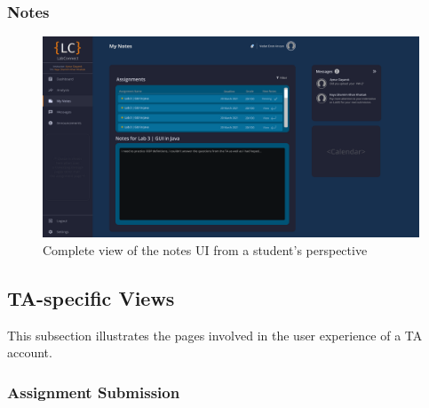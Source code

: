\documentclass[a4paper, 12pt]{article}
\begin{document}
    
    
    
    
    
    
    
    
    
    
    \pagebreak
    
    \subsubsection{Notes}
    
    \begin{figure}[H]
        \centering
        \includegraphics[width=\textwidth]{student_notes}
        \caption{Complete view of the notes UI from a student's perspective}
        \label{fig:student_notes_full}
    \end{figure}
    
    
    
    
    
    
    
    
    
    
    
    
    \pagebreak
    
    
    \subsection{TA-specific Views}
    
    This subsection illustrates the pages involved in the user experience of a TA account.
    
    \subsubsection{Assignment Submission}
    
\end{document}
